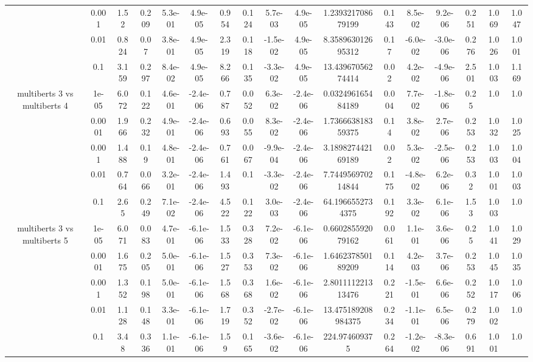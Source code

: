 \begin{tabular}{|c|c|c|c|c|c|c|c|c|c|c|c|c|c|c|c|c|}
 & 0.001 & 1.52 & 0.209 & 5.3e-01 & 4.9e-05 & 0.954 & 0.124 & 5.7e-03 & 4.9e-05 & 1.239321708679199 & 0.143 & 8.5e-02 & 9.2e-06 & 0.251 & 1.069 & 1.047 \\
 & 0.01 & 0.824 & 0.07 & 3.8e-01 & 4.9e-05 & 2.319 & 0.118 & -1.5e-02 & 4.9e-05 & 8.358963012695312 & 0.17 & -6.0e-02 & -3.0e-06 & 0.276 & 1.026 & 1.001 \\
 & 0.1 & 3.159 & 0.297 & 8.4e-02 & 4.9e-05 & 8.266 & 0.135 & -3.3e-02 & 4.9e-05 & 13.43967056274414 & 0.02 & 4.2e-02 & -4.9e-06 & 2.501 & 1.003 & 1.169 \\
\hline
\multirow{5}{*}{multiberts 3 vs multiberts 4} & 1e-05 & 6.072 & 0.122 & 4.6e-01 & -2.4e-06 & 0.787 & 0.052 & 6.3e-02 & -2.4e-06 & 0.032496165484189 & 0.004 & 7.7e-02 & -1.8e-06 & 0.25 & 1.0 & 1.0 \\
 & 0.0001 & 1.966 & 0.232 & 4.9e-01 & -2.4e-06 & 0.693 & 0.055 & 8.3e-02 & -2.4e-06 & 1.736663818359375 & 0.14 & 3.8e-02 & 2.7e-06 & 0.253 & 1.032 & 1.025 \\
 & 0.001 & 1.488 & 0.19 & 4.8e-01 & -2.4e-06 & 0.761 & 0.067 & -9.9e-04 & -2.4e-06 & 3.189827442169189 & 0.02 & 5.3e-02 & -2.5e-06 & 0.253 & 1.003 & 1.004 \\
 & 0.01 & 0.764 & 0.066 & 3.2e-01 & -2.4e-06 & 1.493 & 0.1 & -3.3e-02 & -2.4e-06 & 7.744956970214844 & 0.175 & -4.8e-02 & 6.2e-06 & 0.32 & 1.001 & 1.003 \\
 & 0.1 & 2.65 & 0.249 & 7.1e-02 & -2.4e-06 & 4.522 & 0.122 & 3.0e-03 & -2.4e-06 & 64.1966552734375 & 0.192 & 3.3e-02 & 6.1e-06 & 1.53 & 1.003 & 1.0 \\
\hline
\multirow{5}{*}{multiberts 3 vs multiberts 5} & 1e-05 & 6.071 & 0.083 & 4.7e-01 & -6.1e-06 & 1.533 & 0.328 & 7.2e-02 & -6.1e-06 & 0.660285592079162 & 0.061 & 1.1e-01 & 3.6e-06 & 0.25 & 1.041 & 1.029 \\
 & 0.0001 & 1.675 & 0.205 & 5.0e-01 & -6.1e-06 & 1.527 & 0.353 & 7.3e-02 & -6.1e-06 & 1.646237850189209 & 0.114 & 4.2e-03 & 3.7e-06 & 0.253 & 1.045 & 1.035 \\
 & 0.001 & 1.352 & 0.198 & 5.0e-01 & -6.1e-06 & 1.568 & 0.368 & 1.6e-02 & -6.1e-06 & 2.801111221313476 & 0.221 & -1.5e-01 & 6.6e-06 & 0.252 & 1.017 & 1.006 \\
 & 0.01 & 1.128 & 0.148 & 3.3e-01 & -6.1e-06 & 1.719 & 0.352 & -2.7e-02 & -6.1e-06 & 13.475189208984375 & 0.234 & -1.1e-01 & 6.5e-06 & 0.279 & 1.002 & 1.0 \\
 & 0.1 & 3.48 & 0.336 & 1.1e-01 & -6.1e-06 & 1.59 & 0.165 & -3.6e-02 & -6.1e-06 & 224.974609375 & 0.264 & -1.2e-02 & -8.3e-06 & 0.691 & 1.001 & 1.0 \\

\end{tabular}
